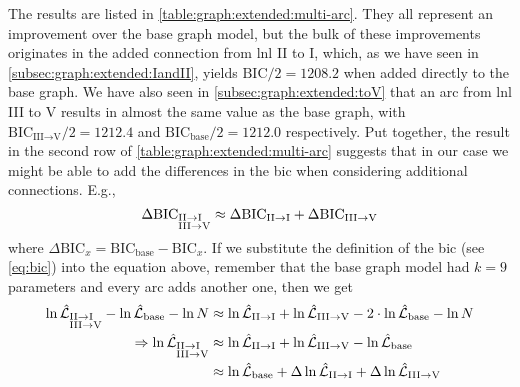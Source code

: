 \documentclass[\relativeRoot/main.tex]{subfiles}
\begin{document}
The results are listed in \cref{table:graph:extended:multi-arc}. They all represent an improvement over the base graph model, but the bulk of these improvements originates in the added connection from \gls{lnl} II to I, which, as we have seen in \cref{subsec:graph:extended:IandII}, yields $\text{BIC}/2 = 1208.2$ when added directly to the base graph. We have also seen in \cref{subsec:graph:extended:toV} that an arc from \gls{lnl} III to V results in almost the same value as the base graph, with $\text{BIC}_{\text{III}\rightarrow\text{V}}/2 = 1212.4$ and $\text{BIC}_\text{base}/2 = 1212.0$ respectively. Put together, the result in the second row of \cref{table:graph:extended:multi-arc} suggests that in our case we might be able to add the differences in the \gls{bic} when considering additional connections. E.g., 
%
\begin{equation}
    \Delta\text{BIC}_{\begin{subarray}{l}\text{II}\rightarrow\text{I} \\ \text{III}\rightarrow\text{V}\end{subarray}} \approx \Delta\text{BIC}_{\text{II}\rightarrow\text{I}} + \Delta\text{BIC}_{\text{III}\rightarrow\text{V}}
\end{equation}
%
where $\Delta\text{BIC}_x = \text{BIC}_\text{base} - \text{BIC}_x$. If we substitute the definition of the \gls{bic} (see \cref{eq:bic}) into the equation above, remember that the base graph model had $k = 9$ parameters and every arc adds another one, then we get
%
\begin{equation}
    \begin{aligned}
        \ln{\hat{\mathcal{L}}_{\begin{subarray}{l}\text{II}\rightarrow\text{I} \\ \text{III}\rightarrow\text{V}\end{subarray}}} - \ln{\hat{\mathcal{L}}_\text{base}} - \ln{N} &\approx \ln{\hat{\mathcal{L}}_{\text{II}\rightarrow\text{I}}} + \ln{\hat{\mathcal{L}}_{\text{III}\rightarrow\text{V}}} - 2 \cdot \ln{\hat{\mathcal{L}}_\text{base}} - \ln{N} \\
        \Rightarrow \ln{\hat{\mathcal{L}}_{\begin{subarray}{l}\text{II}\rightarrow\text{I} \\ \text{III}\rightarrow\text{V}\end{subarray}}} &\approx \ln{\hat{\mathcal{L}}_{\text{II}\rightarrow\text{I}}} + \ln{\hat{\mathcal{L}}_{\text{III}\rightarrow\text{V}}} - \ln{\hat{\mathcal{L}}_\text{base}} \\
        &\approx \ln{\hat{\mathcal{L}}_\text{base}} + \Delta\ln{\hat{\mathcal{L}}_{\text{II}\rightarrow\text{I}}} + \Delta\ln{\hat{\mathcal{L}}_{\text{III}\rightarrow\text{V}}}
    \end{aligned}
\end{equation}
\end{document}
